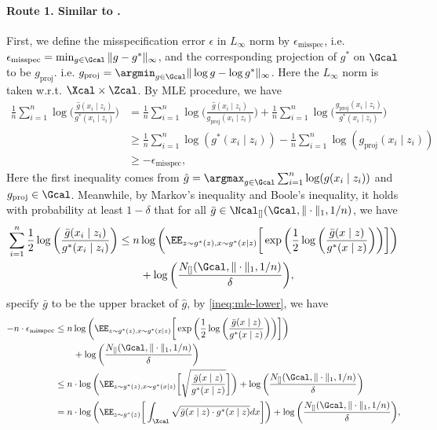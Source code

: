 \documentclass[12pt]{extarticle} %
\newcommand{\misp}{\epsilon_{\text{misspec}}}
\newcommand{\gproj}{g_{\text{proj}}}
\begin{document}
\paragraph{Route 1. Similar to \cite{Zhang_2006,agarwal2020flambe}.} First, we define the misspecification error $\epsilon$ in $L_\infty$ norm by $\misp$, i.e. $\misp = \min_{g\in\Gcal} \|g - g^*\|_\infty$, and the  corresponding projection of $g^*$ on $\Gcal$ to be $\gproj$. i.e. $\gproj = \argmin_{g\in \Gcal} \|\log g - \log g^*\|_\infty$. Here the $L_\infty$ norm is taken w.r.t. $\Xcal \times \Zcal$. By MLE procedure, we have \begin{align}\label{ineq:mle-lower}
    \frac{1}{n}\sum_{i=1}^{n}\log\bigg(\frac{\hat{g}(x_i\mid z_i)}{g^*(x_i \mid z_i)}\bigg)
    &= \frac{1}{n}\sum_{i=1}^{n}\log\bigg(\frac{\hat{g}(x_i\mid z_i)}{\gproj(x_i\mid z_i)}\bigg)+\frac{1}{n}\sum_{i=1}^{n}\log\bigg(\frac{\gproj(x_i\mid z_i)}{g^*(x_i\mid z_i)}\bigg)\nonumber\\
    &\geq \frac{1}{n}\sum_{i=1}^{n} \log(g^*(x_i\mid z_i)) - \frac{1}{n}\sum_{i=1}^{n} \log(\gproj(x_i\mid z_i))\nonumber\\
    &\geq - \misp,
\end{align}
Here the first inequality comes from $\hat{g} = \argmax_{g\in \Gcal} \sum_{i=1}^n\log (g(x_i\mid z_i))$ and $\gproj \in \Gcal$.
Meanwhile, by Markov's inequality and Boole’s inequality, it holds with probability at least $1-\delta$ that for all $\bar{g}\in\Ncal_{[]}(\Gcal,\|\cdot\|_1,1/n)$, we have \begin{align*}
    \sum_{i=1}^{n} \frac{1}{2}\log\bigg(\frac{\bar{g}(x_i\mid z_i)}{g^*(x_i \mid z_i)}\bigg) &\leq n\log\bigg(\EE_{z\sim g^*(z), x\sim g^*(x\mid z)}\bigg[\exp\bigg(\frac{1}{2}\log\bigg(\frac{\bar{g}(x\mid z)}{g^*(x\mid z)}\bigg) \bigg)\bigg]\bigg)\\
    &\qquad+\log\bigg(\frac{N_{[]}(\Gcal,\|\cdot\|_1, 1/n)}{\delta}\bigg),
\end{align*}
specify $\bar{g}$ to be the upper bracket of $\hat{g}$, by \eqref{ineq:mle-lower}, we have \begin{align*}
    -n\cdot\misp &\leq n\log\bigg(\EE_{z\sim g^*(z), x\sim g^*(x\mid z)}\bigg[\exp\bigg(\frac{1}{2}\log\bigg(\frac{\bar{g}(x\mid z)}{g^*(x\mid z)}\bigg) \bigg)\bigg]\bigg)\\
    &\qquad+\log\bigg(\frac{N_{[]}(\Gcal,\|\cdot\|_1, 1/n)}{\delta}\bigg)\\
    &\leq n\cdot \log\bigg(\EE_{z\sim g^*(z), x\sim g^*(x\mid z)}\bigg[\sqrt{\frac{\bar{g}(x\mid z)}{g^*(x\mid z)}}\bigg]\bigg)+\log\bigg(\frac{N_{[]}(\Gcal,\|\cdot\|_1, 1/n)}{\delta}\bigg)\\
    &= n\cdot\log\bigg(\EE_{z\sim g^*(z)}\bigg[\int_{\Xcal} \sqrt{\bar{g}(x\mid z)\cdot g^*(x\mid z)}dx\bigg] \bigg) + \log\bigg(\frac{N_{[]}(\Gcal,\|\cdot\|_1,1/n)}{\delta}\bigg),
\end{align*}
\end{document}
